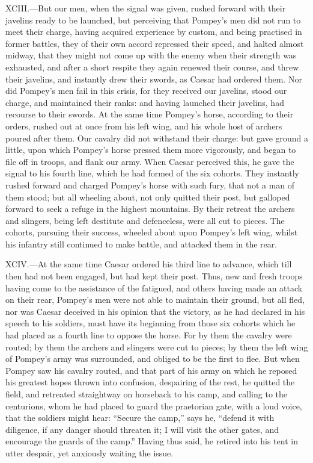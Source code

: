 XCIII.—But our men, when the signal was given, rushed forward with
their javelins ready to be launched, but perceiving that Pompey's men
did not run to meet their charge, having acquired experience by custom,
and being practised in former battles, they of their own accord
repressed their speed, and halted almost midway, that they might not
come up with the enemy when their strength was exhausted, and after a
short respite they again renewed their course, and threw their javelins,
and instantly drew their swords, as Caesar had ordered them. Nor did
Pompey's men fail in this crisis, for they received our javelins, stood
our charge, and maintained their ranks: and having launched their
javelins, had recourse to their swords. At the same time Pompey's horse,
according to their orders, rushed out at once from his left wing, and
his whole host of archers poured after them. Our cavalry did not
withstand their charge: but gave ground a little, upon which Pompey's
horse pressed them more vigorously, and began to file off in troops, and
flank our army. When Caesar perceived this, he gave the signal to his
fourth line, which he had formed of the six cohorts. They instantly
rushed forward and charged Pompey's horse with such fury, that not a man
of them stood; but all wheeling about, not only quitted their post, but
galloped forward to seek a refuge in the highest mountains. By their
retreat the archers and slingers, being left destitute and defenceless,
were all cut to pieces. The cohorts, pursuing their success, wheeled
about upon Pompey's left wing, whilst his infantry still continued to
make battle, and attacked them in the rear.

XCIV.—At the same time Caesar ordered his third line to advance, which
till then had not been engaged, but had kept their post. Thus, new and
fresh troops having come to the assistance of the fatigued, and others
having made an attack on their rear, Pompey's men were not able to
maintain their ground, but all fled, nor was Caesar deceived in his
opinion that the victory, as he had declared in his speech to his
soldiers, must have its beginning from those six cohorts which he had
placed as a fourth line to oppose the horse. For by them the cavalry
were routed; by them the archers and slingers were cut to pieces; by
them the left wing of Pompey's army was surrounded, and obliged to be
the first to flee. But when Pompey saw his cavalry routed, and that part
of his army on which he reposed his greatest hopes thrown into
confusion, despairing of the rest, he quitted the field, and retreated
straightway on horseback to his camp, and calling to the centurions,
whom he had placed to guard the praetorian gate, with a loud voice, that
the soldiers might hear: ``Secure the camp,'' says he, ``defend it with
diligence, if any danger should threaten it; I will visit the other
gates, and encourage the guards of the camp.'' Having thus said, he
retired into his tent in utter despair, yet anxiously waiting the issue.

